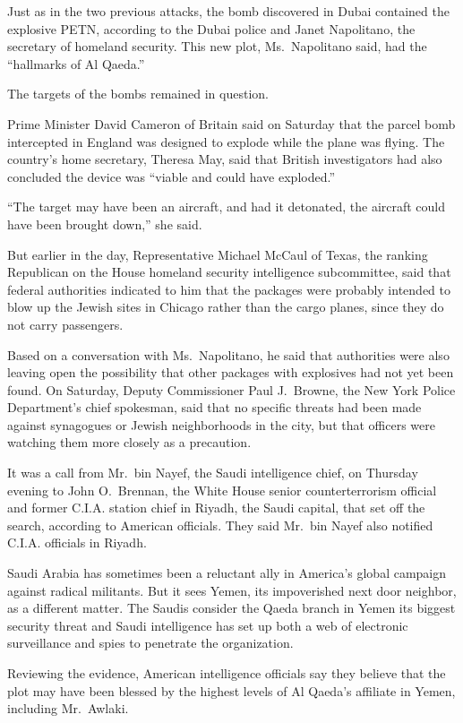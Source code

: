 ﻿\documentclass[12pt]{article}
\begin{document}
Just as in the two previous attacks, the bomb discovered in Dubai contained the explosive PETN,
according to the Dubai police and Janet Napolitano, the secretary of homeland security. This new
plot, Ms.~Napolitano said, had the ``hallmarks of Al Qaeda.''

The targets of the bombs remained in question.

Prime Minister David Cameron of Britain said on Saturday that the parcel bomb intercepted in England
was designed to explode while the plane was flying. The country's home secretary, Theresa May, said
that British investigators had also concluded the device was ``viable and could have exploded.''

``The target may have been an aircraft, and had it detonated, the aircraft could have been brought
down,'' she said.

But earlier in the day, Representative Michael McCaul of Texas, the ranking Republican on the House
homeland security intelligence subcommittee, said that federal authorities indicated to him that the
packages were probably intended to blow up the Jewish sites in Chicago rather than the cargo planes,
since they do not carry passengers.

Based on a conversation with Ms.~Napolitano, he said that authorities were also leaving open the
possibility that other packages with explosives had not yet been found. On Saturday, Deputy
Commissioner Paul J.~Browne, the New York Police Department's chief spokesman, said that no specific
threats had been made against synagogues or Jewish neighborhoods in the city, but that officers were
watching them more closely as a precaution.

It was a call from Mr.~bin Nayef, the Saudi intelligence chief, on Thursday evening to John
O.~Brennan, the White House senior counterterrorism official and former C.I.A. station chief in
Riyadh, the Saudi capital, that set off the search, according to American officials. They said
Mr.~bin Nayef also notified C.I.A. officials in Riyadh.

Saudi Arabia has sometimes been a reluctant ally in America's global campaign against radical
militants. But it sees Yemen, its impoverished next door neighbor, as a different matter. The Saudis
consider the Qaeda branch in Yemen its biggest security threat and Saudi intelligence has set up
both a web of electronic surveillance and spies to penetrate the organization.

Reviewing the evidence, American intelligence officials say they believe that the plot may have been
blessed by the highest levels of Al Qaeda's affiliate in Yemen, including Mr.~Awlaki.
\end{document}

